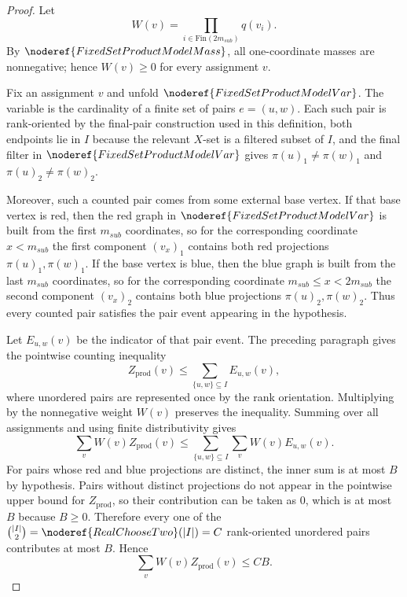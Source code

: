 \begin{proof}
Let
\[
W(v)=\prod_{i\in\mathrm{Fin}(2m_{sub})}q(v_i).
\]
By \(\noderef{FixedSetProductModelMass}\), all one-coordinate masses are
nonnegative; hence \(W(v)\ge0\) for every assignment \(v\).

Fix an assignment \(v\) and unfold
\(\noderef{FixedSetProductModelVar}\).  The variable is the cardinality of a
finite set of pairs \(e=(u,w)\).  Each such pair is rank-oriented by the
final-pair construction used in this definition, both endpoints lie in \(I\)
because the relevant \(X\)-set is a filtered subset of \(I\), and the final
filter in \(\noderef{FixedSetProductModelVar}\) gives
\(\pi(u)_1\ne\pi(w)_1\) and \(\pi(u)_2\ne\pi(w)_2\).

Moreover, such a counted pair comes from some external base vertex.  If that
base vertex is red, then the red graph in
\(\noderef{FixedSetProductModelVar}\) is built from the first \(m_{sub}\)
coordinates, so for the corresponding coordinate \(x<m_{sub}\) the first
component \((v_x)_1\) contains both red projections \(\pi(u)_1,\pi(w)_1\).
If the base vertex is blue, then the blue graph is built from the last
\(m_{sub}\) coordinates, so for the corresponding coordinate
\(m_{sub}\le x<2m_{sub}\) the second component \((v_x)_2\) contains both
blue projections \(\pi(u)_2,\pi(w)_2\).  Thus every counted pair satisfies the
pair event appearing in the hypothesis.

Let \(E_{u,w}(v)\) be the indicator of that pair event.  The preceding
paragraph gives the pointwise counting inequality
\[
Z_{\mathrm{prod}}(v)
\le
\sum_{\{u,w\}\subseteq I} E_{u,w}(v),
\]
where unordered pairs are represented once by the rank orientation.  Multiplying
by the nonnegative weight \(W(v)\) preserves the inequality.  Summing over all
assignments and using finite distributivity gives
\[
\sum_v W(v)Z_{\mathrm{prod}}(v)
\le
\sum_{\{u,w\}\subseteq I}\sum_v W(v)E_{u,w}(v).
\]
For pairs whose red and blue projections are distinct, the inner sum is at
most \(B\) by hypothesis.  Pairs without distinct projections do not appear in
the pointwise upper bound for \(Z_{\mathrm{prod}}\), so their contribution can
be taken as \(0\), which is at most \(B\) because \(B\ge0\).  Therefore every
one of the \(\binom{|I|}{2}=\noderef{RealChooseTwo}(|I|)=C\) rank-oriented
unordered pairs contributes at most \(B\).  Hence
\[
\sum_v W(v)Z_{\mathrm{prod}}(v)\le C B.
\]
\end{proof}
